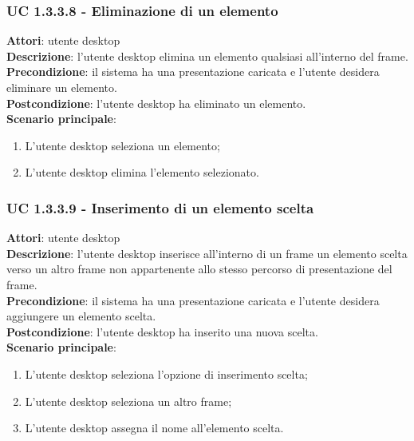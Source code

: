 \subsubsection{UC 1.3.3.8 - Eliminazione di un elemento}{
	\label{uc1.3.3.8}
	\textbf{Attori}: utente desktop \\
	\textbf{Descrizione}: l'utente desktop elimina un elemento qualsiasi all'interno del frame. \\
	\textbf{Precondizione}: il sistema ha una presentazione caricata e l'utente desidera eliminare un elemento.	\\
	\textbf{Postcondizione}: l'utente desktop ha eliminato un elemento.	\\
	\textbf{Scenario principale}:
	\begin{enumerate}
		\item L'utente desktop seleziona un elemento;
		\item L'utente desktop elimina l'elemento selezionato.
	\end{enumerate}
	}
\subsubsection{UC 1.3.3.9 - Inserimento di un elemento scelta}{
	\label{uc1.3.3.9}
	\textbf{Attori}: utente desktop \\
	\textbf{Descrizione}: l'utente desktop inserisce all'interno di un frame un elemento scelta verso un altro frame non appartenente allo stesso percorso di presentazione del frame. \\
	\textbf{Precondizione}: il sistema ha una presentazione caricata e l'utente desidera aggiungere un elemento scelta.	\\
	\textbf{Postcondizione}: l'utente desktop ha inserito una nuova scelta.	\\
	\textbf{Scenario principale}:
	\begin{enumerate}
		\item L'utente desktop seleziona l'opzione di inserimento scelta;
		\item L'utente desktop seleziona un altro frame;
		\item L'utente desktop assegna il nome all'elemento scelta.
	\end{enumerate}
	}
